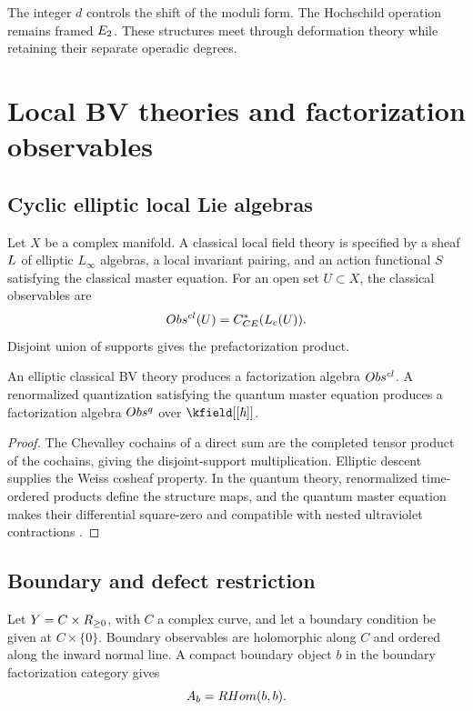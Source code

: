 The integer $d$ controls the shift of the moduli form. The Hochschild operation remains framed $E_2$. These structures meet through deformation theory while retaining their separate operadic degrees.

\chapter{Local BV theories and factorization observables}
\section{Cyclic elliptic local Lie algebras}
Let $X$ be a complex manifold. A classical local field theory is specified by a sheaf $L$ of elliptic $L_\infty$ algebras, a local invariant pairing, and an action functional $S$ satisfying the classical master equation. For an open set $U\subset X$, the classical observables are
\[
 Obs^{cl}(U)=C^*_{CE}(L_c(U)).
\]
Disjoint union of supports gives the prefactorization product.

\begin{theorem}
An elliptic classical BV theory produces a factorization algebra $Obs^{cl}$. A renormalized quantization satisfying the quantum master equation produces a factorization algebra $Obs^{q}$ over $\kfield[[\hbar]]$.
\end{theorem}
\begin{proof}
The Chevalley cochains of a direct sum are the completed tensor product of the cochains, giving the disjoint-support multiplication. Elliptic descent supplies the Weiss cosheaf property. In the quantum theory, renormalized time-ordered products define the structure maps, and the quantum master equation makes their differential square-zero and compatible with nested ultraviolet contractions \cite{CG1,CG2}.
\end{proof}

\section{Boundary and defect restriction}
Let $Y=C\times R_{\ge0}$, with $C$ a complex curve, and let a boundary condition be given at $C\times\{0\}$. Boundary observables are holomorphic along $C$ and ordered along the inward normal line. A compact boundary object $b$ in the boundary factorization category gives
\[
 A_b=RHom(b,b).
\]

